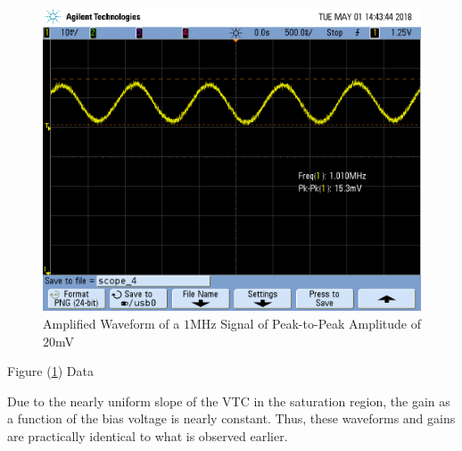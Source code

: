 \FloatBarrier

\begin{figure}[h!]
	\centering
	\includegraphics[scale=0.45]{./images/SCOPE_4.PNG}
	\caption{Amplified Waveform of a $1$\si{\mega\hertz} Signal of Peak-to-Peak Amplitude of $20$\si{\milli\volt}}
	\label{fig:SCOPE_4}
\end{figure}

\FloatBarrier

\begin{table}[h!]
	\centering
	\caption{Figure (\ref{fig:SCOPE_4}) Data}
	\label{tab:gain_part1_plus10mV}
\end{table}

\FloatBarrier

Due to the nearly uniform slope of the VTC in the saturation region, the gain as a function of the bias voltage is nearly constant.
Thus, these waveforms and gains are practically identical to what is observed earlier.

